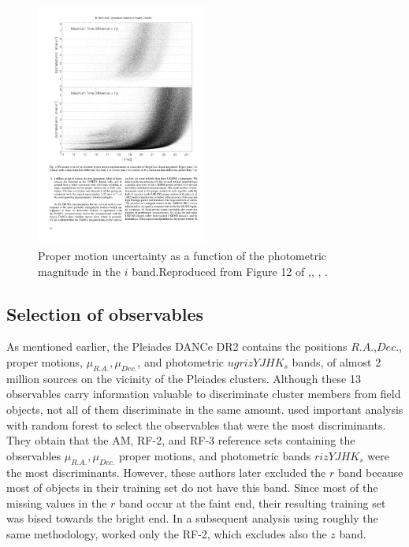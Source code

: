 \begin{figure}[ht!]
\begin{center}
\includegraphics[height=8cm]{background/Figures/F12_Bouy2013.pdf}
\caption{Proper motion uncertainty as a function of the photometric magnitude in the $i$ band.Reproduced from Figure 12 of \citet{Bouy2013},\textit{}, , .}
\label{fig:pmuncert}
\end{center}
\end{figure}

\subsection{Selection of observables}
\sloppy
As mentioned earlier, the Pleiades DANCe DR2 contains the positions $R.A.$,$Dec.$, proper motions, $\mu_{R.A.},\mu_{Dec.}$, and photometric $ugrizYJHK_s$ bands, of almost 2 million sources on the vicinity of the Pleiades clusters. Although these 13 observables carry information valuable to discriminate cluster members from field objects, not all of them discriminate in the same amount. \citet{Sarro2014} used important analysis with random forest to select the observables that were the most discriminants. They obtain that the AM, RF-2, and RF-3 reference sets containing the observables $\mu_{R.A.},\mu_{Dec.}$ proper motions, and photometric bands $rizYJHK_s$ were the most discriminants. However, these authors later excluded the $r$ band because most of objects in their training set do not have this band. Since most of the missing values in the $r$ band occur at the faint end, their resulting training set was bised towards the bright end. In a subsequent analysis using roughly the same methodology, \citet{Bouy2015} worked only the RF-2, which excludes also the $z$ band.

